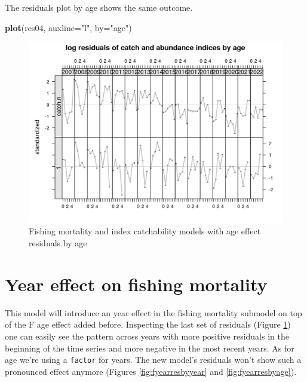 \documentclass[
]{book}
\newenvironment{Shaded}{\begin{snugshade}}{\end{snugshade}}
\newcommand{\AttributeTok}[1]{\textcolor[rgb]{0.13,0.29,0.53}{#1}}
\newcommand{\FunctionTok}[1]{\textcolor[rgb]{0.13,0.29,0.53}{\textbf{#1}}}
\newcommand{\NormalTok}[1]{#1}
\newcommand{\StringTok}[1]{\textcolor[rgb]{0.31,0.60,0.02}{#1}}
\begin{document}
The residuals plot by age shows the same outcome.

\begin{Shaded}
\begin{Highlighting}[]
\FunctionTok{plot}\NormalTok{(res04, }\AttributeTok{auxline=}\StringTok{"l"}\NormalTok{, }\AttributeTok{by=}\StringTok{"age"}\NormalTok{)}
\end{Highlighting}
\end{Shaded}

\begin{figure}
\centering
\includegraphics{_bookdown_files/_main_files/figure-html/fqageresbyage-1.png}
\caption{\label{fig:fqageresbyage}Fishing mortality and index catchability models with age effect residuals by age}
\end{figure}

\hypertarget{year-effect-on-fishing-mortality}{%
\section{Year effect on fishing mortality}\label{year-effect-on-fishing-mortality}}

This model will introduce an year effect in the fishing mortality submodel on top of the F age effect added before. Inspecting the last set of residuals (Figure \ref{fig:fqageresbyage}) one can easily see the pattern across years with more positive residuals in the beginning of the time series and more negative in the most recent years. As for age we're using a \texttt{factor} for years. The new model's residuals won't show such a pronounced effect anymore (Figures \ref{fig:fyearresbyyear} and \ref{fig:fyearresbyage}).
\end{document}
